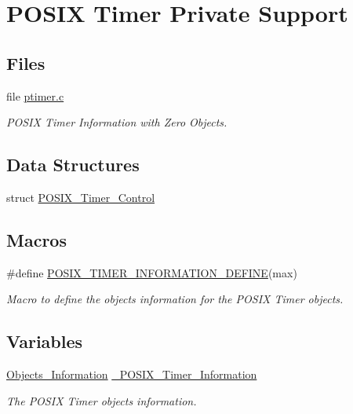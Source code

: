 \hypertarget{group__POSIX__INTERNAL__TIMERS}{}\section{P\+O\+S\+IX Timer Private Support}
\label{group__POSIX__INTERNAL__TIMERS}
\subsection*{Files}
\begin{DoxyCompactItemize}
\item 
file \mbox{\hyperlink{ptimer_8c}{ptimer.\+c}}
\begin{DoxyCompactList}\small\item\em P\+O\+S\+IX Timer Information with Zero Objects. \end{DoxyCompactList}\end{DoxyCompactItemize}
\subsection*{Data Structures}
\begin{DoxyCompactItemize}
\item 
struct \mbox{\hyperlink{structPOSIX__Timer__Control}{P\+O\+S\+I\+X\+\_\+\+Timer\+\_\+\+Control}}
\end{DoxyCompactItemize}
\subsection*{Macros}
\begin{DoxyCompactItemize}
\item 
\#define \mbox{\hyperlink{group__POSIX__INTERNAL__TIMERS_ga312ba050172c274f2f3144ca1f1726e5}{P\+O\+S\+I\+X\+\_\+\+T\+I\+M\+E\+R\+\_\+\+I\+N\+F\+O\+R\+M\+A\+T\+I\+O\+N\+\_\+\+D\+E\+F\+I\+NE}}(max)
\begin{DoxyCompactList}\small\item\em Macro to define the objects information for the P\+O\+S\+IX Timer objects. \end{DoxyCompactList}\end{DoxyCompactItemize}
\subsection*{Variables}
\begin{DoxyCompactItemize}
\item 
\mbox{\label{group__POSIX__INTERNAL__TIMERS_ga853ccfb9963a37f095d12b59b774f7d6}} 
\mbox{\hyperlink{structObjects__Information}{Objects\+\_\+\+Information}} \mbox{\hyperlink{group__POSIX__INTERNAL__TIMERS_ga853ccfb9963a37f095d12b59b774f7d6}{\+\_\+\+P\+O\+S\+I\+X\+\_\+\+Timer\+\_\+\+Information}}
\begin{DoxyCompactList}\small\item\em The P\+O\+S\+IX Timer objects information. \end{DoxyCompactList}\end{DoxyCompactItemize}



